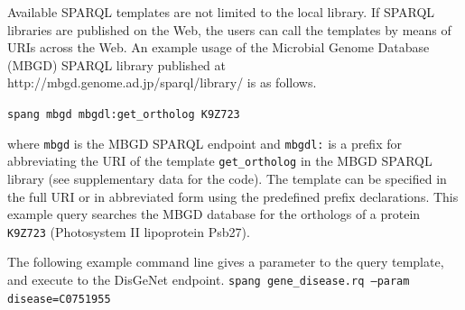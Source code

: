 \documentclass[runningheads]{llncs}
\begin{document}
Available SPARQL templates are not limited to the local library.
If SPARQL libraries are published on the Web, the users can call the templates by means of URIs across the Web.
An example usage of the Microbial Genome Database (MBGD) SPARQL library published at http://mbgd.genome.ad.jp/sparql/library/ is as follows.
\begin{quoting}
\texttt{spang mbgd mbgdl:get\_ortholog K9Z723}
\vspace{1pt}
\end{quoting}
where {\tt mbgd} is the MBGD SPARQL endpoint \citep{Chiba} and \texttt{mbgdl:} is a prefix for abbreviating the URI of the template {\tt get\_ortholog} in the MBGD SPARQL library (see supplementary data for the code). 
The template can be specified in the full URI or in abbreviated form using the predefined prefix declarations.
This example query searches the MBGD database \citep{Uchiyama} for the orthologs of a protein \texttt{K9Z723} (Photosystem II lipoprotein Psb27).

The following example command line gives a parameter to the query template, and execute to the DisGeNet endpoint.
\texttt{spang gene\_disease.rq --param disease=C0751955}



\end{document}
